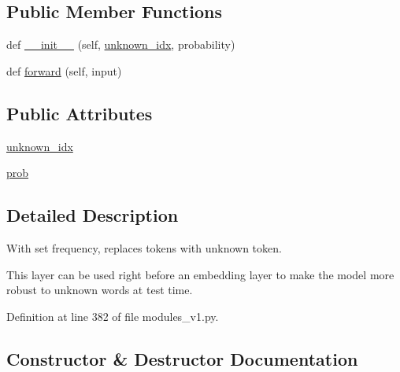 \subsection*{Public Member Functions}
\begin{DoxyCompactItemize}
\item 
def \hyperlink{classparlai_1_1agents_1_1legacy__agents_1_1seq2seq_1_1modules__v1_1_1UnknownDropout_a7063d1866221608f272c2c6697d4b98b}{\+\_\+\+\_\+init\+\_\+\+\_\+} (self, \hyperlink{classparlai_1_1agents_1_1legacy__agents_1_1seq2seq_1_1modules__v1_1_1UnknownDropout_a7c6fe2c4afa06bf542c36ea9821b243f}{unknown\+\_\+idx}, probability)
\item 
def \hyperlink{classparlai_1_1agents_1_1legacy__agents_1_1seq2seq_1_1modules__v1_1_1UnknownDropout_a4527e73a4211e888db806e4526c0126e}{forward} (self, input)
\end{DoxyCompactItemize}
\subsection*{Public Attributes}
\begin{DoxyCompactItemize}
\item 
\hyperlink{classparlai_1_1agents_1_1legacy__agents_1_1seq2seq_1_1modules__v1_1_1UnknownDropout_a7c6fe2c4afa06bf542c36ea9821b243f}{unknown\+\_\+idx}
\item 
\hyperlink{classparlai_1_1agents_1_1legacy__agents_1_1seq2seq_1_1modules__v1_1_1UnknownDropout_a7d5b061b69c0857aec6dfe3f3f5cd9ed}{prob}
\end{DoxyCompactItemize}


\subsection{Detailed Description}
\begin{DoxyVerb}With set frequency, replaces tokens with unknown token.

This layer can be used right before an embedding layer to make the model more robust
to unknown words at test time.
\end{DoxyVerb}
 

Definition at line 382 of file modules\+\_\+v1.\+py.



\subsection{Constructor \& Destructor Documentation}
\mbox{\label{classparlai_1_1agents_1_1legacy__agents_1_1seq2seq_1_1modules__v1_1_1UnknownDropout_a7063d1866221608f272c2c6697d4b98b}} 
